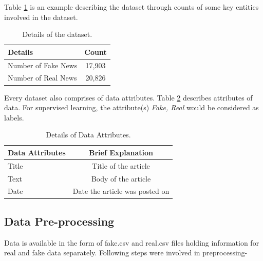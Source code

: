 \documentclass[runningheads]{llncs}
\begin{document}
Table \ref{tbl:dataset} is an example describing the dataset through counts of some key entities involved in the dataset.
\begin{table}
\centering
\begin{tabular}{|l|c|}
\hline
\textbf{Details} &  \textbf{Count}\\
\hline
Number of Fake News & 17,903 \\
\hline
Number of Real News & 20,826\\
\hline
\end{tabular}
\caption{Details of the dataset.}
\label{tbl:dataset}
\end{table}

Every dataset also comprises of data attributes. Table \ref{tbl:dataset-attributes} describes attributes of data.
For supervised learning, the attribute(s) \textit{Fake, Real} would be considered as labels. 

\begin{table}
\centering
\begin{tabular}{|l|c|}
\hline
\textbf{Data Attributes} &  \textbf{Brief Explanation}\\
\hline
Title & Title of the article \\
\hline
Text & Body of the article \\
\hline
Date & Date the article was posted on\\
\hline
\end{tabular}
\caption{Details of Data Attributes.}
\label{tbl:dataset-attributes}
\end{table}

\subsection{Data Pre-processing}
Data is available in the form of fake.csv and real.csv files holding information for real and fake data separately. 
Following steps were involved in preprocessing-
\end{document}
